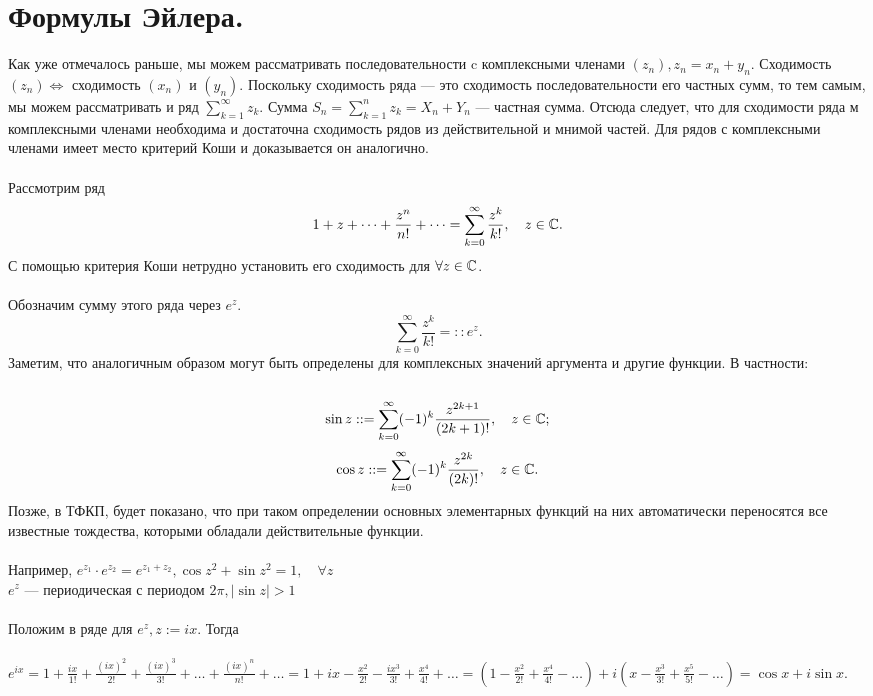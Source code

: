	\section{Формулы Эйлера.}
	Как уже отмечалось раньше, мы можем рассматривать последовательности c комплексными членами $(z_n), z_n = x_n + y_n$. Сходимость $(z_n) \Leftrightarrow$ сходимость $(x_n)$ и $(y_n)$. Поскольку сходимость ряда --- это сходимость последовательности его частных сумм, то тем самым, мы можем рассматривать и ряд
	$\sum\limits_{k=1}^{\infty}z_k$.
	Сумма $S_n = \sum\limits^{n}_{k=1}z_k = X_n + Y_n$ --- частная сумма. Отсюда следует, что для сходимости ряда м комплексными членами необходима и достаточна сходимость рядов из действительной и мнимой частей. Для рядов с комплексными членами имеет место критерий Коши и доказывается он аналогично.\\\\
	Рассмотрим ряд $$1 + z + \dots + \frac{z^n}{n!} + \dots = \sum\limits^{\infty}_{k=0}\frac{z^k}{k!}, \quad z \in \mathbb{C}.$$
	С помощью критерия Коши нетрудно установить его сходимость для $\forall z \in \mathbb{C}$.\\\\
	Обозначим сумму этого ряда через $e^z$.\\
	$$\sum\limits^{\infty}_{k=0}\frac{z^k}{k!}=::e^z.$$
	Заметим, что аналогичным образом могут быть определены для комплексных значений аргумента и другие функции. В частности:\\\\
	$$\sin{z}::= \sum\limits^{\infty}_{k=0}(-1)^k\frac{z^{2k+1}}{(2k+1)!}, \quad z \in \mathbb{C};$$
	$$\cos{z}::= \sum\limits^{\infty}_{k=0}(-1)^k\frac{z^{2k}}{(2k)!}, \quad z \in \mathbb{C}.$$
	Позже, в ТФКП, будет показано, что при таком определении основных элементарных функций на них автоматически переносятся все известные тождества, которыми обладали действительные функции.\\\\
	Например, $e^{z_1} \cdot e^{z_2} = e^{z_1+z_2}, \cos{z}^{2} + \sin{z}^2 = 1, \quad \forall z$\\
	$e^z$ --- периодическая с периодом $2\pi, |\sin{z}| > 1$\\\\
	Положим в ряде для $e^z, z:=ix$. Тогда\\\\
	$e^{ix} = 1 + \frac{ix}{1!} + \frac{(ix)^2}{2!} + \frac{(ix)^3}{3!} + \dots + \frac{(ix)^n}{n!} + \dots = 1 + ix - \frac{x^2}{2!} - \frac{ix^3}{3!} + \frac{x^4}{4!} + \dots = (1 - \frac{x^2}{2!} + \frac{x^4}{4!} - \dots) + i(x - \frac{x^3}{3!} + \frac{x^5}{5!} - \dots) = \cos{x} + i\sin{x}$.\\\\
